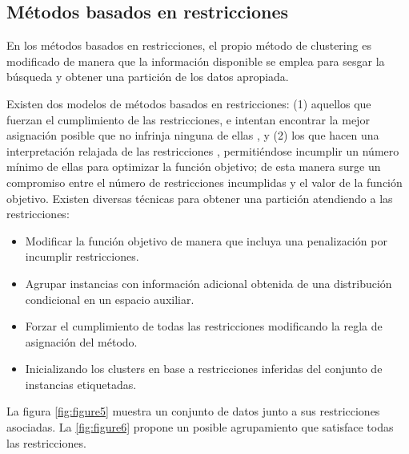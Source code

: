 \subsection{Métodos basados en restricciones}

En los métodos basados en restricciones, el propio método de clustering es modificado de manera que la información disponible se emplea para sesgar la búsqueda y obtener una partición de los datos apropiada.

Existen dos modelos de métodos basados en restricciones: (1) aquellos que fuerzan el cumplimiento de las restricciones, e intentan encontrar la mejor asignación posible que no infrinja ninguna de ellas \cite{Wagstaff:2001b}\cite{DavidsonRavi:2005b}, y (2) los que hacen una interpretación relajada de las restricciones \cite{Basu:2004}\cite{Seagal:2003}\cite{DavidsonRavi:2005a}\cite{Law:2005}, permitiéndose incumplir un número mínimo de ellas para optimizar la función objetivo; de esta manera surge un compromiso entre el número de restricciones incumplidas y el valor de la función objetivo. Existen diversas técnicas para obtener una partición atendiendo a las restricciones:

\begin{itemize}
	
	\item Modificar la función objetivo de manera que incluya una penalización por incumplir restricciones. \cite{Demiriz:1999} \cite{DavidsonRavi:2005a}
	
	\item Agrupar instancias con información adicional obtenida de una distribución condicional en un espacio auxiliar. \cite{SinkkonenKaski:2000}
	
	\item Forzar el cumplimiento de todas las restricciones modificando la regla de asignación del método. \cite{Wagstaff:2001b}
	
	\item Inicializando los clusters en base a restricciones inferidas del conjunto de instancias etiquetadas.\cite{Basu:2002}
	
\end{itemize}

La figura \ref{fig:figure5} muestra un conjunto de datos junto a sus restricciones asociadas. La \ref{fig:figure6} propone un posible agrupamiento que satisface todas las restricciones.

